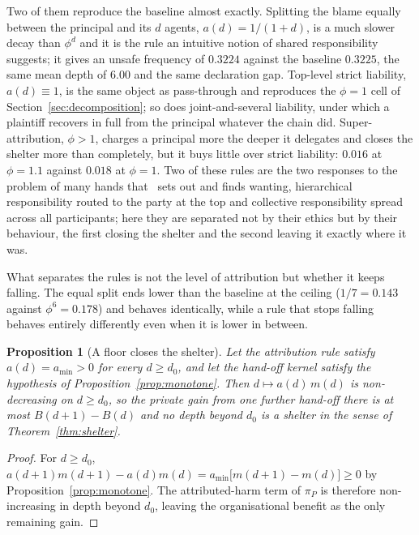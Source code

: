 \documentclass[11pt,a4paper]{article}
\newtheorem{proposition}[theorem]{Proposition}
\theoremstyle{definition}
\begin{document}
Two of them reproduce the baseline almost exactly. Splitting the blame equally
between the principal and its $d$ agents, $a(d)=1/(1+d)$, is a much slower
decay than $\phi^{d}$ and it is the rule an intuitive notion of shared
responsibility suggests; it gives an unsafe frequency of $0.3224$ against the
baseline $0.3225$, the same mean depth of $6.00$ and the same declaration gap.
Top-level strict liability, $a(d)\equiv1$, is the same object as pass-through
and reproduces the $\phi=1$ cell of Section~\ref{sec:decomposition}; so does
joint-and-several liability, under which a plaintiff recovers in full from the
principal whatever the chain did. Super-attribution, $\phi>1$, charges a
principal more the deeper it delegates and closes the shelter more than
completely, but it buys little over strict liability: $0.016$ at $\phi=1.1$
against $0.018$ at $\phi=1$. Two of these rules are the two responses to the
problem of many hands that~\citet{thompson1980hands} sets out and finds
wanting, hierarchical responsibility routed to the party at the top and
collective responsibility spread across all participants; here they are
separated not by their ethics but by their behaviour, the first closing the
shelter and the second leaving it exactly where it was.

What separates the rules is not the level of attribution but whether it keeps
falling. The equal split ends lower than the baseline at the ceiling
($1/7=0.143$ against $\phi^{6}=0.178$) and behaves identically, while a rule
that stops falling behaves entirely differently even when it is lower in
between.

\begin{proposition}[A floor closes the shelter]
\label{prop:floor}
Let the attribution rule satisfy $a(d)=a_{\min}>0$ for every $d\ge d_{0}$, and
let the hand-off kernel satisfy the hypothesis of
Proposition~\ref{prop:monotone}. Then $d\mapsto a(d)\,m(d)$ is non-decreasing
on $d\ge d_{0}$, so the private gain from one further hand-off there is at most
$B(d+1)-B(d)$ and no depth beyond $d_{0}$ is a shelter in the sense of
Theorem~\ref{thm:shelter}.
\end{proposition}

\begin{proof}
For $d\ge d_{0}$, $a(d+1)m(d+1)-a(d)m(d)=a_{\min}\bigl[m(d+1)-m(d)\bigr]\ge0$
by Proposition~\ref{prop:monotone}. The attributed-harm term of $\pi_{P}$ is
therefore non-increasing in depth beyond $d_{0}$, leaving the organisational
benefit as the only remaining gain.
\end{proof}
\end{document}
